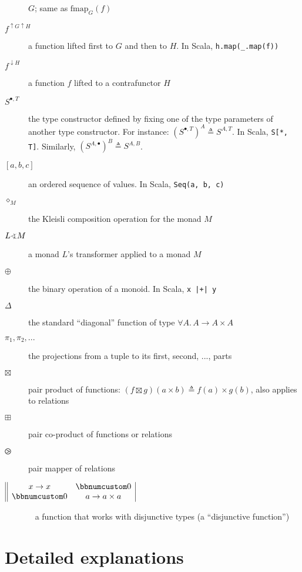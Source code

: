 \begin{description}
$G$; same as $\text{fmap}_{G}(f)$
\item [{$f^{\uparrow G\uparrow H}$}] \textemdash{} a function lifted first
to $G$ and then to $H$. In Scala, \lstinline!h.map(_.map(f))! 
\item [{$f^{\downarrow H}$}] \textemdash{} a function $f$ lifted to a
contrafunctor $H$ 
\item [{$S^{\bullet,T}$}] \textemdash{} the type constructor defined by
fixing one of the type parameters of another type constructor. For
instance: $(S^{\bullet,T})^{A}\triangleq S^{A,T}$. In Scala, \lstinline!S[*, T]!.
Similarly, $(S^{A,\bullet})^{B}\triangleq S^{A,B}$. 
\item [{$\left[a,b,c\right]$}] \textemdash{} an ordered sequence of values.
In Scala, \lstinline!Seq(a, b, c)!
\item [{$\diamond_{M}$}] \textemdash{} the Kleisli composition operation
for the monad $M$
\item [{$L\varangle M$}] \textemdash{} a monad $L$\textsf{'}s transformer applied
to a monad $M$
\item [{$\oplus$}] \textemdash{} the binary operation of a monoid. In
Scala, \lstinline!x |+| y!
\item [{$\Delta$}] \textemdash{} the standard \textsf{``}diagonal\textsf{''} function
of type $\forall A.\,A\rightarrow A\times A$
\item [{$\pi_{1},\pi_{2},...$}] \textemdash{} the projections from a tuple
to its first, second, ..., parts
\item [{$\boxtimes$}] \textemdash{} pair product of functions: $(f\boxtimes g)(a\times b)\triangleq f(a)\times g(b)$,
also applies to relations
\item [{$\boxplus$}] \textemdash{} pair co-product of functions or relations
\item [{$\ogreaterthan$}] \textemdash{} pair mapper of relations
\item [{$\begin{array}{||cc|}
x\rightarrow x & \bbnum 0\\
\bbnum 0 & a\rightarrow a\times a
\end{array}$}] ~ \textemdash{} a function that works with disjunctive types
(a \textsf{``}disjunctive function\textsf{''})
\end{description}

\section{Detailed explanations}

